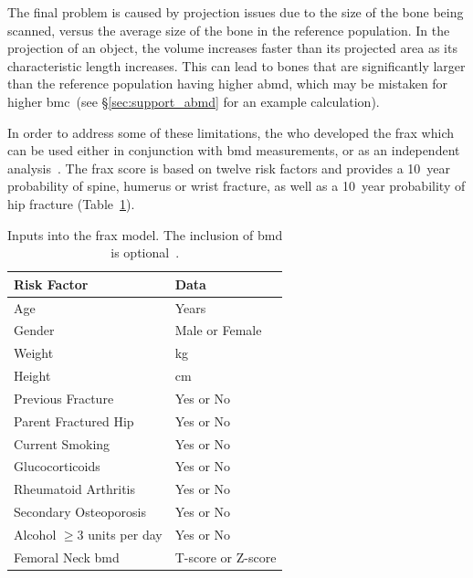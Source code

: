 The final problem is caused by projection issues due to the size of the bone being scanned, versus the average size of the bone in the reference population.
In the projection of an object, the volume increases faster than its projected area as its characteristic length increases.
This can lead to bones that are significantly larger than the reference population having higher \ac{abmd}, which may be mistaken for higher \ac{bmc}~(see \S\ref{sec:support_abmd} for an example calculation).

In order to address some of these limitations, the \ac{who} developed the \ac{frax} which can be used either in conjunction with \ac{bmd} measurements, or as an independent analysis~\citep{kanis_fraxtm_2008}.
The \ac{frax} score is based on twelve risk factors and provides a 10~year probability of spine, humerus or wrist fracture, as well as a 10~year probability of hip fracture (Table~\ref{tab:frax}).

\begin{table}
\caption[Inputs to the \acs*{frax} model]{Inputs into the \acs*{frax} model. The inclusion of \ac{bmd} is optional~\citep{kanis_fraxtm_2008, van_den_bergh_assessment_2010}.}
\label{tab:frax}
\begin{tabularx}{0.75\textwidth}{>{\centering\arraybackslash}X >{\centering\arraybackslash}X}
\toprule
\textbf{Risk Factor} & \textbf{Data} \\ 
\midrule
 Age & Years \\ 
 Gender & Male or Female \\ 
 Weight & \ac{kg} \\ 
 Height & \ac{cm} \\ 
 Previous Fracture & Yes or No \\ 
 Parent Fractured Hip & Yes or No \\ 
 Current Smoking & Yes or No \\ 
 Glucocorticoids & Yes or No \\ 
 Rheumatoid Arthritis & Yes or No \\ 
 Secondary Osteoporosis & Yes or No \\ 
 Alcohol $\geq$3 units per day & Yes or No \\ 
 Femoral Neck \ac{bmd} & T-score or Z-score \\ 
\bottomrule 
\end{tabularx} 
\end{table}

